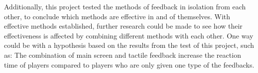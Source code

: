 Additionally, this project tested the methods of feedback in isolation from each other, to conclude which methods are effective in and of themselves. With effective methods established, further research could be made to see how their effectiveness is affected by combining different methods with each other. One way could be with a hypothesis based on the results from the test of this project, such as: The combination of main screen and tactile feedback increase the reaction time of players compared to players who are only given one type of the feedbacks. 